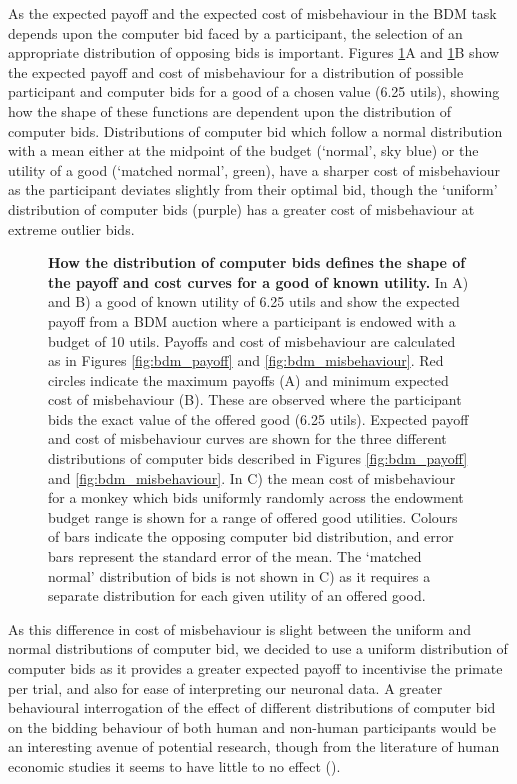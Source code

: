 As the expected payoff and the expected cost of misbehaviour in the BDM task depends upon the computer bid faced by a participant, the selection of an appropriate distribution of opposing bids is important. Figures \ref{fig:bdm_computer_bids}A and \ref{fig:bdm_computer_bids}B show the expected payoff and cost of misbehaviour for a distribution of possible participant and computer bids for a good of a chosen value (6.25 utils), showing how the shape of these functions are dependent upon the distribution of computer bids. Distributions of computer bid which follow a normal distribution with a mean either at the midpoint of the budget (‘normal’, sky blue) or the utility of a good (‘matched normal’, green), have a sharper cost of misbehaviour as the participant deviates slightly from their optimal bid, though the ‘uniform’ distribution of computer bids (purple) has a greater cost of misbehaviour at extreme outlier bids.

\begin{figure}[p] 
\centering    

\caption[How the distribution of computer bids defines the shape of the payoff and cost curves for a good of known utility.]{\textbf{How the distribution of computer bids defines the shape of the payoff and cost curves for a good of known utility.} In A) and B) a good of known utility of 6.25 utils and show the expected payoff from a BDM auction where a participant is endowed with a budget of 10 utils. Payoffs and cost of misbehaviour are calculated as in Figures \ref{fig:bdm_payoff} and \ref{fig:bdm_misbehaviour}. Red circles indicate the maximum payoffs (A) and minimum expected cost of misbehaviour (B). These are observed where the participant bids the exact value of the offered good (6.25 utils). Expected payoff and cost of misbehaviour curves are shown for the three different distributions of computer bids described in Figures \ref{fig:bdm_payoff} and \ref{fig:bdm_misbehaviour}. In C) the mean cost of misbehaviour for a monkey which bids uniformly randomly across the endowment budget range is shown for a range of offered good utilities. Colours of bars indicate the opposing computer bid distribution, and error bars represent the standard error of the mean. The ‘matched normal’ distribution of bids is not shown in C) as it requires a separate distribution for each given utility of an offered good.}
\label{fig:bdm_computer_bids}
\end{figure}

As this difference in cost of misbehaviour is slight between the uniform and normal distributions of computer bid, we decided to use a uniform distribution of computer bids as it provides a greater expected payoff to incentivise the primate per trial, and also for ease of interpreting our neuronal data. A greater behavioural interrogation of the effect of different distributions of computer bid on the bidding behaviour of both human and non-human participants would be an interesting avenue of potential research, though from the literature of human economic studies it seems to have little to no effect (\cite{irwinPayoffDominanceVs1998}).

